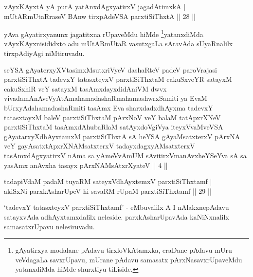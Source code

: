 
\begin{shl}
vAyxKAyxtA yA purA yatAnxdAgxyatirxV jagadAtimxkA | \\
mUtARmUtaRraseV BAnw tirxpAdeVSA parxtiSiThxtA \hfill ||  28 || 
\end{shl}

\begin{artha} 
yAva gAyatirxyanunx jagatitxna rUpaveMdu hiMde 
\footnote{gAyatirxya modalane pAdavu tirxloVkAtamxka, eraDane 
pAdavu mUru veVdagaLa savxrUpavu, mUrane pAdavu samasatx 
pArxNasavxrUpaveMdu yatanxdiMda hiMde shurxtiyu tiLiside.}yatanxdiMda  vAyxKAyxnisididxto adu mUtARmUtaR vasutxgaLa 
sAravAda sUyaRnalilx tirxpAdiyAgi niMtiruvadu.
\end{artha}

\begin{kandikeshl}
seYSA gAyaterxyXVtasimxMsutxriVyeV dashaRteV padeV paroVrajasi parxtiSiThxtA tadevxY tatasxteyxV parxtiSiThxtaM cakuSxveYR satayxM cakuSxhiR veY satayxM tasAmxdayxdidAniVM dwvx vivadamAnAveVyAtAmahamadashaRmahamashwrxSamiti ya EvaM bUrxyAdahamadashaRmiti tasAmx Eva sharxdadxdhAyxma tadevxY tatasxtayxM baleV parxtiSiThxtaM pArxNoV veY balaM tatApxrXNeV parxtiSiThxtaM tasAmxdAhubaRlaM satAyxdoVgiVya iteyxVvaMveVSA gAyatarxyXdhAyxtamxM parxtiSiThxtA sA heYSA gAyaMsatxterxV pArxNA veY gayAsatxtApxrXNAMsatxterxV tadayxdagxyAMsatxterxV tasAmxdAgxyatirxV nAma sa yAmeVvAmUM sAvitirxVmanAvxheYSeYva sA sa yasAmx anAvxha tasayx pArxNAMsAtxrXyateV || 4 ||
\end{kandikeshl}


\begin{shl}
tadapiVdaM padaM tuyaRM sateyxV\s dhAyxtemxV parxtiSiThxtamf | \\
akiSxNi parxkAsharUpeV hi savaRM rUpaM parxtiSiThxtamf \hfill ||  29 ||
\end{shl}

\begin{artha} 
`tadevxY tatasxteyxV parxtiSiThxtamf' - eMbuvalilx A I nAlakxnepAdavu 
satayxvAda adhAyxtamxdalilx neleside. parxkAsharUpavAda kaNiNxnalilx 
samasatxrUpavu nelesiruvadu.
\end{artha}

